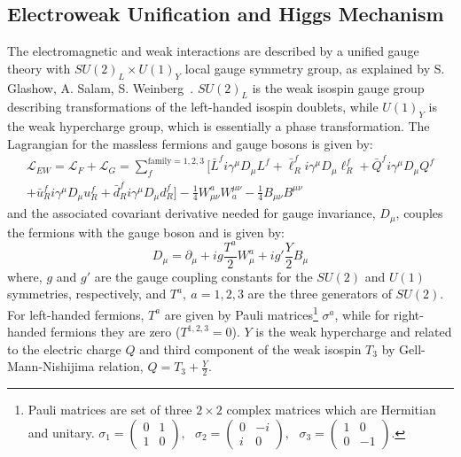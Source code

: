 \subsection{Electroweak Unification and Higgs Mechanism}
The electromagnetic and weak interactions are described by a unified gauge theory with ${SU(2)_{L}}\times{U(1)_{Y}}$ local gauge symmetry group,
as explained by S. Glashow, A. Salam, S. Weinberg~\cite{Glashow:1961tr, Salam:1964ry, Weinberg:1967tq}. $SU(2)_{L}$ is the weak isospin gauge 
group describing transformations of the left-handed isospin doublets, while $U(1)_{Y}$ is the weak hypercharge group, which is essentially a 
phase transformation. The Lagrangian for the massless fermions and gauge bosons is given by:
\begin{multline}
\mathcal{L}_{EW} = \mathcal{L}_{F} + \mathcal{L}_{G} = \sum_{f}^{\text{family}=1,2,3}\bigg[ \bar{L}^{f}i\gamma^{\mu}D_{\mu}L^{f}  
                   +  \bar{\ell}^{f}_{R}i\gamma^{\mu}D_{\mu}\ell^{f}_{R}  +  \bar{Q}^{f}i\gamma^{\mu}D_{\mu}Q^{f}  \\
                   +   \bar{u}^{f}_{R}i\gamma^{\mu}D_{\mu}u^{f}_{R}  +  \bar{d}^{f}_{R}i\gamma^{\mu}D_{\mu}d^{f}_{R} \bigg]  
                   - \frac{1}{4}W_{\mu\nu}^{a}W^{\mu\nu}_{a} - \frac{1}{4}B_{\mu\nu}B^{\mu\nu}
\label{eq:LagrangianEW}
\end{multline}
and the associated covariant derivative needed for gauge invariance, $D_{\mu}$, couples the fermions with the gauge boson and is given by:
\begin{equation}
D_{\mu} = \partial_{\mu} + ig\frac{T^{a}}{2}W^{a}_{\mu} + ig'\frac{Y}{2}B_{\mu}
\label{eq:CovDer}
\end{equation}
where, $g$ and $g'$ are the gauge coupling constants for the $SU(2)$ and $U(1)$ symmetries, respectively, and $T^{a},\:a=1,2,3$ are the three
generators of $SU(2)$. For left-handed fermions, $T^{a}$ are given by Pauli matrices\footnote{Pauli matrices are set of three 
$2\times2$ complex matrices which are Hermitian and unitary.
\newline
$\sigma_{1} = \left(\begin{array}{cc} 0 & 1 \\ 1 & 0 \end{array}\right),\:\:\:
\sigma_{2} = \left(\begin{array}{cc} 0 & -i \\ i & 0 \end{array}\right),\:\:\:
\sigma_{3} = \left(\begin{array}{cc} 1 & 0 \\ 0 & -1 \end{array}\right).$}
$\sigma^{a}$, while for right-handed fermions they are zero ($T^{1,2,3}=0$).
$Y$ is the weak hypercharge and related to the electric charge $Q$ and third component of the weak isospin $T_{3}$ by Gell-Mann-Nishijima 
relation, $Q = T_{3} + \frac{Y}{2}$.

